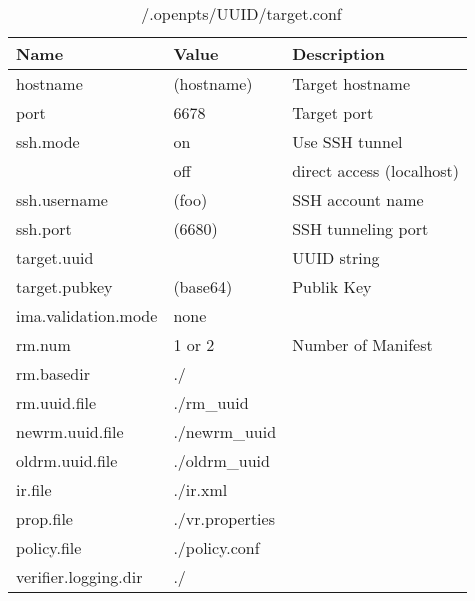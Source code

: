 \begin{table}[h]
\caption{~/.openpts/UUID/target.conf}
\label{table:target:conf}
\begin{center}
\begin{tabular}{lll}
    \hline
    Name & Value & Description  \\
    \hline  \hline
hostname & (hostname) & Target hostname\\
port & 6678 & Target port\\
\hline
ssh.mode & on & Use SSH tunnel\\
         & off & direct access (localhost)\\
\hline
ssh.username & (foo) & SSH account name\\
ssh.port & (6680) & SSH tunneling port\\
\hline
target.uuid & & UUID string \\
target.pubkey & (base64) & Publik Key \\
\hline
ima.validation.mode & none & \\
\hline
rm.num & 1 or 2 & Number of Manifest\\
rm.basedir & ./ & \\
rm.uuid.file & ./rm\_uuid & \\
newrm.uuid.file & ./newrm\_uuid & \\
oldrm.uuid.file & ./oldrm\_uuid & \\
ir.file & ./ir.xml & \\
prop.file & ./vr.properties & \\
policy.file & ./policy.conf & \\
verifier.logging.dir & ./ & \\
\hline

    \hline
\end{tabular}
\end{center}
\end{table}


